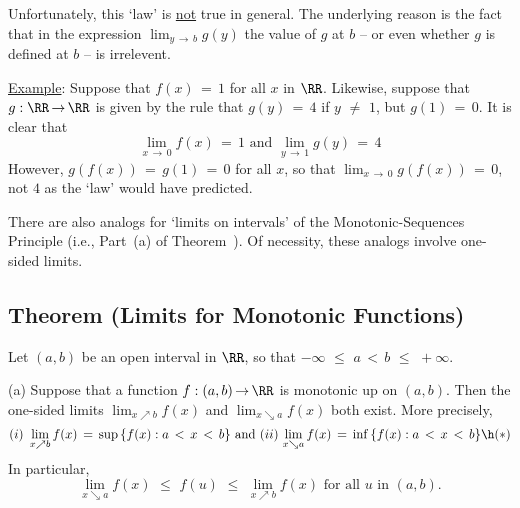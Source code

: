     Unfortunately, this `law' is \underline{not} true in general. The underlying reason is the fact that
    in the expression $\lim_{y \,{\rightarrow}\, b} g(y)$ the value of $g$ at $b$ -- or even whether $g$ is defined at $b$ -- is irrelevent.

\V

        \underline{Example}: Suppose that $f(x) \,=\, 1$ for all $x$ in ${\RR}$.
    Likewise, suppose that $g:{\RR} \,{\rightarrow}\, {\RR}$ is given by the rule that $g(y) \,=\, 4$ if $y \,\,{\neq}\,\, 1$, but $g(1) \,=\, 0$.
    It is clear that
        \begin{displaymath}
        \lim_{x \,{\rightarrow}\, 0} f(x) \,=\, 1 \mbox{ and } 
        \lim_{y \,{\rightarrow}\, 1} g(y) \,=\, 4
        \end{displaymath}
    However, $g(f(x)) \,=\, g(1) \,=\, 0$ for all $x$, so that ${\displaystyle \lim_{x \,{\rightarrow}\, 0} g(f(x))} \,=\, 0$, not $4$ as the `law' would have predicted.

\VV

        There are also analogs for `limits on intervals' of the Monotonic-Sequences Principle (i.e., Part~(a) of Theorem~).
    Of necessity, these analogs involve one-sided limits.

\V

            \subsection{\small{\bf Theorem (Limits for Monotonic Functions)}}
            \label{ThmC90.90}
\V

        Let $(a,b)$ be an open interval in ${\RR}$, so that $-{\infty}\,\,{\leq}\,\,a\,<\,b\,\,{\leq}\,\,+{\infty}$.

\V

       (a) Suppose that a function $f:(a,b) \,{\rightarrow}\, {\RR}$ is monotonic up on $(a,b)$. Then the one-sided limits $\lim_{x{\nearrow}b} f(x)$ and $\lim_{x{\searrow}a} f(x)$ both exist.
    More precisely,
        \begin{displaymath}
        (i)\,\,\lim_{x{\nearrow}b} f(x) \,=\, {\sup}\,\{f(x): a\,<\,x\,<\,b\}
    \mbox{ and }
        (ii)\,\lim_{x{\searrow}a} f(x) \,=\, {\inf}\,\{f(x): a\,<\,x\,<\,b\} \h
        ({\ast})
        \end{displaymath}
    In particular, 
        \begin{displaymath}
        \lim_{x{\searrow}a} f(x)\,\,{\leq}\,\,f(u)\,\,{\leq}\,\,\lim_{x{\nearrow}b} f(x) \mbox{ for all $u$ in $(a,b)$}.
        \end{displaymath}

